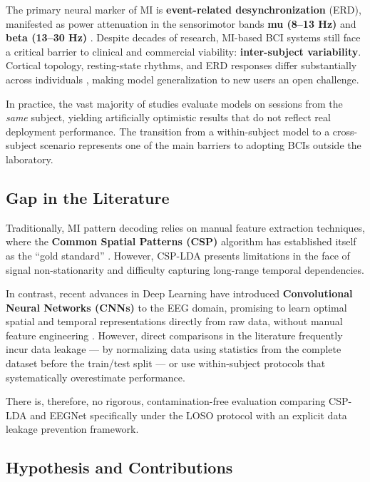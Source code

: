 \documentclass[conference]{IEEEtran}
\begin{document}
The primary neural marker of MI is \textbf{event-related desynchronization} (ERD), manifested as power attenuation in the sensorimotor bands \textbf{mu (8--13 Hz)} and \textbf{beta (13--30 Hz)} \cite{guo2024variation}. Despite decades of research, MI-based BCI systems still face a critical barrier to clinical and commercial viability: \textbf{inter-subject variability}. Cortical topology, resting-state rhythms, and ERD responses differ substantially across individuals \cite{duann2016comparison}, making model generalization to new users an open challenge.

In practice, the vast majority of studies evaluate models on sessions from the \textit{same} subject, yielding artificially optimistic results that do not reflect real deployment performance. The transition from a within-subject model to a cross-subject scenario represents one of the main barriers to adopting BCIs outside the laboratory.

\subsection{Gap in the Literature}

Traditionally, MI pattern decoding relies on manual feature extraction techniques, where the \textbf{Common Spatial Patterns (CSP)} algorithm has established itself as the ``gold standard'' \cite{blankertz2008optimizing}. However, CSP-LDA presents limitations in the face of signal non-stationarity and difficulty capturing long-range temporal dependencies.

In contrast, recent advances in Deep Learning have introduced \textbf{Convolutional Neural Networks (CNNs)} to the EEG domain, promising to learn optimal spatial and temporal representations directly from raw data, without manual feature engineering \cite{schirrmeister2017deep}. However, direct comparisons in the literature frequently incur data leakage --- by normalizing data using statistics from the complete dataset before the train/test split --- or use within-subject protocols that systematically overestimate performance.

There is, therefore, no rigorous, contamination-free evaluation comparing CSP-LDA and EEGNet specifically under the LOSO protocol with an explicit data leakage prevention framework.

\subsection{Hypothesis and Contributions}
\end{document}
